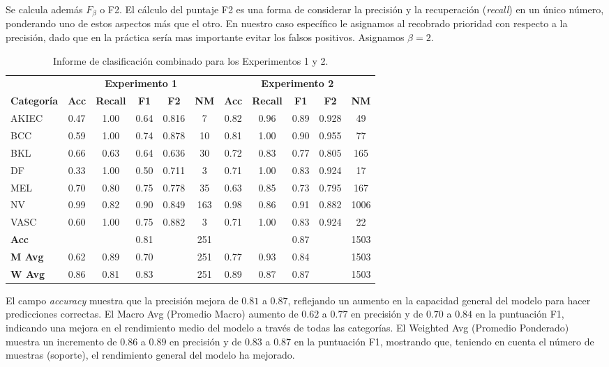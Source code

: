 Se calcula además $F_{\beta}$ o F2. El cálculo del puntaje F2 es una forma de considerar la precisión y la recuperación (\textit{recall}) en un único número, ponderando uno de estos aspectos más que el otro. En nuestro caso específico le asignamos al recobrado prioridad con respecto a la precisión, dado que en la práctica sería mas importante evitar los falsos positivos. Asignamos $\beta = 2$.

\begin{table}[H]
    \small
    \centering
    \caption{Informe de clasificación combinado para los Experimentos 1 y 2.}
    \label{tab:classification_report_combined}
    \begin{tabular}{lcccccccccc}
    \hline
    & \multicolumn{5}{c}{\textbf{Experimento 1}} & \multicolumn{5}{c}{\textbf{Experimento 2}} \\
    \cline{2-10}
    \textbf{Categoría} & \textbf{Acc} & \textbf{Recall} & \textbf{F1} & \textbf{F2} & \textbf{NM} & \textbf{Acc} & \textbf{Recall} & \textbf{F1} & \textbf{F2} & \textbf{NM} \\
    \hline
    AKIEC & 0.47 & 1.00 & 0.64 & 0.816 & 7   & 0.82 & 0.96 & 0.89 & 0.928  & 49 \\
    BCC   & 0.59 & 1.00 & 0.74 & 0.878 & 10  & 0.81 & 1.00 & 0.90 &  0.955 & 77 \\
    BKL   & 0.66 & 0.63 & 0.64 & 0.636 & 30  & 0.72 & 0.83 & 0.77 & 0.805  & 165 \\
    DF    & 0.33 & 1.00 & 0.50 & 0.711 & 3   & 0.71 & 1.00 & 0.83 & 0.924  & 17 \\
    MEL   & 0.70 & 0.80 & 0.75 & 0.778 & 35  & 0.63 & 0.85 & 0.73 & 0.795  & 167 \\
    NV    & 0.99 & 0.82 & 0.90 & 0.849 & 163 & 0.98 & 0.86 & 0.91 & 0.882  & 1006 \\
    VASC  & 0.60 & 1.00 & 0.75 & 0.882 & 3   & 0.71 & 1.00 & 0.83 & 0.924  & 22 \\
    \hline
    \textbf{Acc} & & & 0.81 & & 251 & & & 0.87 & & 1503 \\
    \textbf{M Avg} & 0.62 & 0.89 & 0.70 & & 251 & 0.77 & 0.93 & 0.84 & & 1503 \\
    \textbf{W Avg} & 0.86 & 0.81 & 0.83 & & 251 & 0.89 & 0.87 & 0.87 & & 1503 \\
    \hline
    \end{tabular}
\end{table}



El campo \textit{accuracy} muestra que la precisión mejora de $0.81$ a $0.87$, reflejando un aumento en la capacidad general del modelo para hacer predicciones correctas. El Macro Avg (Promedio Macro) aumento de $0.62$ a $0.77$ en precisión y de $0.70$ a $0.84$ en la puntuación F1, indicando una mejora en el rendimiento medio del modelo a través de todas las categorías. El Weighted Avg (Promedio Ponderado) muestra un incremento de $0.86$ a $0.89$ en precisión y de $0.83$ a $0.87$ en la puntuación F1, mostrando que, teniendo en cuenta el número de muestras (soporte), el rendimiento general del modelo ha mejorado.

